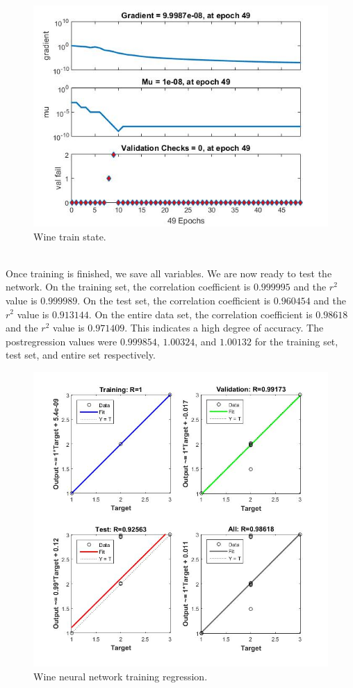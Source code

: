 \documentclass{article}%
\begin{document}
\begin{figure}[H]
\centering
\includegraphics[scale=0.5]{Wine/train_state.jpg}
\caption{Wine train state.}
\label{fig:winetrain}
\end{figure}
\\
Once training is finished, we save all variables. We are now ready to test the network. On the training set, the correlation coefficient is $0.999995$ and the $r^2$ value is $0.999989$. On the test set, the correlation coefficient is $0.960454$ and the $r^2$ value is $0.913144$. On the entire data set, the correlation coefficient is $0.98618$ and the $r^2$ value is $0.971409$. This indicates a high degree of accuracy. The postregression values were $0.999854$, $1.00324$, and $1.00132$ for the training set, test set, and entire set respectively.
\begin{figure}[H]
\centering
\includegraphics[scale=0.3]{Wine/regression.jpg}
\caption{Wine neural network training regression.}
\label{fig:winereg}
\end{figure}
\end{document}
